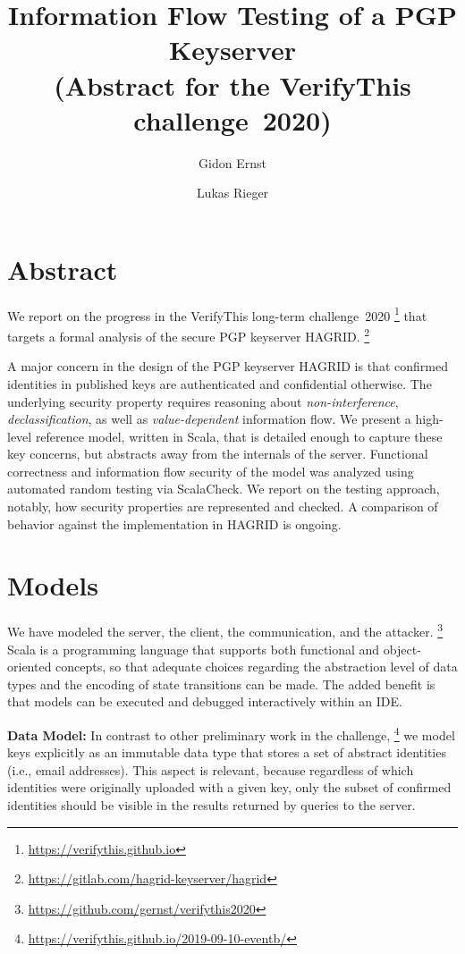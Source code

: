 \documentclass{llncs}
\title{Information Flow Testing of a PGP Keyserver \\
       (Abstract for the VerifyThis challenge~2020)}
\author{Gidon Ernst \and Lukas Rieger}
\institute{LMU Munich, \email{gidon.ernst@lmu.de}}
\begin{document}
\maketitle

\section{Abstract}

We report on the progress in the VerifyThis long-term challenge~2020%
    \footnote{\url{https://verifythis.github.io}}
that targets a formal analysis of the secure PGP keyserver HAGRID.%
    \footnote{\url{https://gitlab.com/hagrid-keyserver/hagrid}}

A major concern in the design of the PGP keyserver HAGRID is that confirmed identities in published keys are authenticated and confidential otherwise.
The underlying security property requires reasoning about \emph{non-interference}, \emph{declassification}, as well as \emph{value-dependent} information flow.
We present a high-level reference model, written in Scala, that is detailed enough to capture these key concerns, but abstracts away from the internals of the server.
Functional correctness and information flow security of the model was analyzed using automated random testing via ScalaCheck.
We report on the testing approach, notably, how security properties are represented and checked.
A comparison of behavior against the implementation in HAGRID is ongoing.

\section{Models}

We have modeled the server, the client, the communication, and the attacker.%
    \footnote{\url{https://github.com/gernst/verifythis2020}}
Scala is a programming language that supports both functional and object-oriented concepts,
so that adequate choices regarding the abstraction level of data types and the encoding of state transitions can be made.
The added benefit is that models can be executed and debugged interactively within an IDE.

\textbf{Data Model:} In contrast to other preliminary work in the challenge,%
    \footnote{\url{https://verifythis.github.io/2019-09-10-eventb/}}
we model keys explicitly as an immutable data type that stores a set of abstract identities (i.e., email addresses).
This aspect is relevant, because regardless of which identities were originally uploaded with a given key,
only the subset of confirmed identities should be visible in the results returned by queries to the server.
\end{document}
